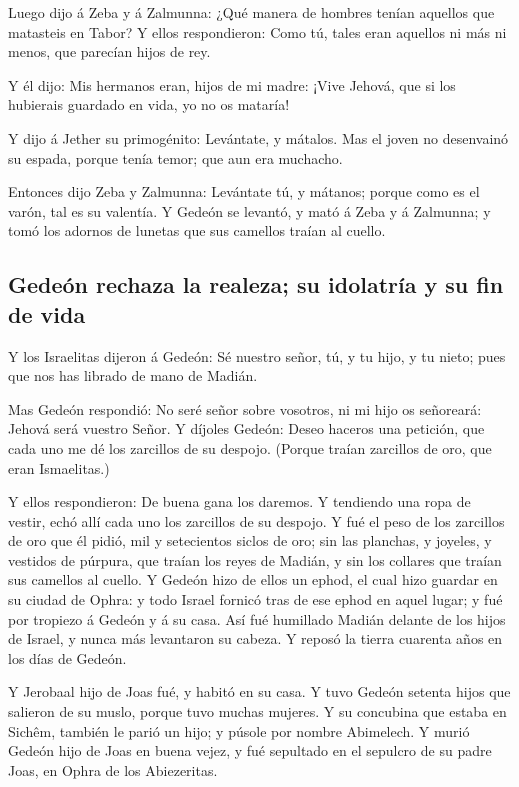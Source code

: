  Luego dijo á Zeba y á Zalmunna: ¿Qué manera de hombres
tenían aquellos que matasteis en Tabor? Y ellos respondieron: Como tú,
tales eran aquellos ni más ni menos, que parecían hijos de rey.

 Y él dijo: Mis hermanos eran, hijos de mi madre: ¡Vive
Jehová, que si los hubierais guardado en vida, yo no os mataría!

 Y dijo á Jether su primogénito: Levántate, y mátalos.
Mas el joven no desenvainó su espada, porque tenía temor; que aun era
muchacho.

 Entonces dijo Zeba y Zalmunna: Levántate tú, y mátanos;
porque como es el varón, tal es su valentía. Y Gedeón se levantó, y mató
á Zeba y á Zalmunna; y tomó los adornos de lunetas que sus camellos
traían al cuello.

\hypertarget{gedeuxf3n-rechaza-la-realeza-su-idolatruxeda-y-su-fin-de-vida}{%
\subsection{Gedeón rechaza la realeza; su idolatría y su fin de
vida}\label{gedeuxf3n-rechaza-la-realeza-su-idolatruxeda-y-su-fin-de-vida}}

 Y los Israelitas dijeron á Gedeón: Sé nuestro señor, tú,
y tu hijo, y tu nieto; pues que nos has librado de mano de Madián.

 Mas Gedeón respondió: No seré señor sobre vosotros, ni
mi hijo os señoreará: Jehová será vuestro Señor.  Y
díjoles Gedeón: Deseo haceros una petición, que cada uno me dé los
zarcillos de su despojo. (Porque traían zarcillos de oro, que eran
Ismaelitas.)

 Y ellos respondieron: De buena gana los daremos. Y
tendiendo una ropa de vestir, echó allí cada uno los zarcillos de su
despojo.  Y fué el peso de los zarcillos de oro que él
pidió, mil y setecientos siclos de oro; sin las planchas, y joyeles, y
vestidos de púrpura, que traían los reyes de Madián, y sin los collares
que traían sus camellos al cuello.  Y Gedeón hizo de
ellos un ephod, el cual hizo guardar en su ciudad de Ophra: y todo
Israel fornicó tras de ese ephod en aquel lugar; y fué por tropiezo á
Gedeón y á su casa.  Así fué humillado Madián delante de
los hijos de Israel, y nunca más levantaron su cabeza. Y reposó la
tierra cuarenta años en los días de Gedeón.

 Y Jerobaal hijo de Joas fué, y habitó en su casa.
 Y tuvo Gedeón setenta hijos que salieron de su muslo,
porque tuvo muchas mujeres.  Y su concubina que estaba en
Sichêm, también le parió un hijo; y púsole por nombre Abimelech.
 Y murió Gedeón hijo de Joas en buena vejez, y fué
sepultado en el sepulcro de su padre Joas, en Ophra de los Abiezeritas.

